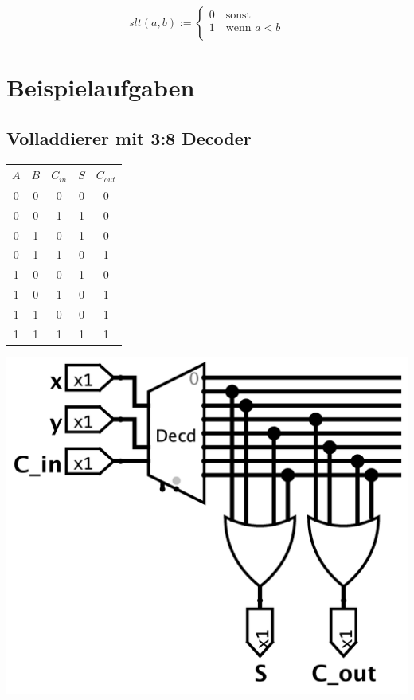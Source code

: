 \documentclass[a4paper,6pt]{article}
\begin{document}
\begin{multicols*}{3}
$$
slt(a,b) :=
\begin{cases}
    0 \quad \text{sonst} \\
    1 \quad \text{wenn } a < b \\
\end{cases}
$$

\section{Beispielaufgaben}

\subsection*{Volladdierer mit 3:8 Decoder}
\tiny
\begin{center}
   \begin{tabular}{ccc|cc}
    \hline
    $A$ & $B$ & $C_{in}$ & $S$ & $C_{out}$ \\ \hline
    0 & 0 & 0   & 0 & 0    \\
    0 & 0 & 1   & 1 & 0    \\
    0 & 1 & 0   & 1 & 0    \\
    0 & 1 & 1   & 0 & 1    \\
    1 & 0 & 0   & 1 & 0    \\
    1 & 0 & 1   & 0 & 1    \\
    1 & 1 & 0   & 0 & 1    \\
    1 & 1 & 1   & 1 & 1    \\ \hline
    \end{tabular} 
\end{center}

\scriptsize

\begin{center}
    \includegraphics[width=0.75\linewidth]{resources/Decoder_Full_Adder.png}
\end{center}


\end{multicols*}
\end{document}
